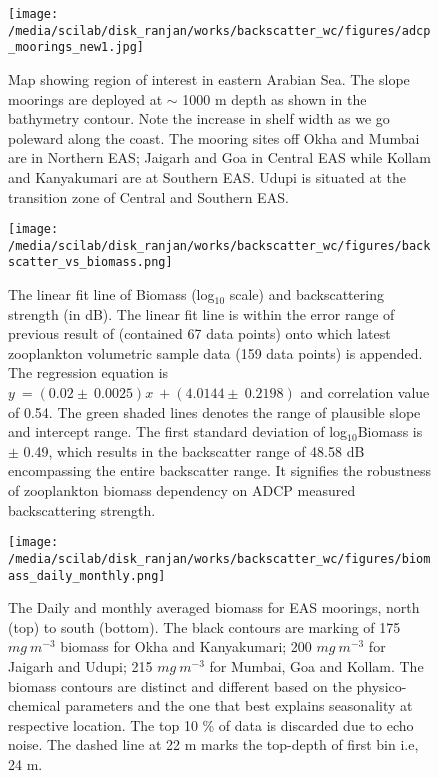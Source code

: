 \documentclass{article}
\begin{document}
\newpage
\begin{figure}[htbp]
	\centering
	\texttt{[image: /media/scilab/disk\_ranjan/works/backscatter\_wc/figures/adcp\_moorings\_new1.jpg]} 
	\captionsetup{justification=justified,font=footnotesize,skip=0.05\baselineskip,width=0.8\textwidth}
	\caption{Map showing region of interest in eastern Arabian Sea. The slope moorings are
		deployed at $\sim$ 1000 m depth as shown in the bathymetry contour. Note the increase in shelf width as we go poleward along the coast. The mooring sites off Okha and Mumbai are in Northern EAS; Jaigarh and Goa in Central EAS while Kollam and Kanyakumari are at Southern EAS. Udupi is situated at the transition zone of Central and Southern EAS.}
	\label{fig:map}
\end{figure}

\newpage
\begin{figure}[htbp]
	\centering
	\texttt{[image: /media/scilab/disk\_ranjan/works/backscatter\_wc/figures/backscatter\_vs\_biomass.png]} 
	\captionsetup{justification=justified,font=footnotesize,skip=0.05\baselineskip,width=0.8\textwidth}
	\caption{The linear fit line of Biomass (log$_10$ scale) and backscattering strength (in dB). The linear fit line is within the error range of previous result of \citep{aparna2022seasonal} (contained 67 data points) onto which latest zooplankton volumetric sample data (159 data points) is appended. The regression equation is $y\ = (0.02 \pm\ 0.0025) x\ + (4.0144 \pm \ 0.2198) $ and correlation value of 0.54. The green shaded lines denotes the range of plausible slope and intercept range. The first standard deviation of log$_{10}$Biomass is $\pm$ 0.49, which results in the backscatter range of 48.58 dB encompassing the entire backscatter range. It signifies the robustness of zooplankton biomass dependency on ADCP measured backscattering strength.}
	\label{fig:bstobm}
\end{figure}


\newpage


\begin{figure}[htbp]
	\centering
	\texttt{[image: /media/scilab/disk\_ranjan/works/backscatter\_wc/figures/biomass\_daily\_monthly.png]} 
	\captionsetup{justification=justified,font=footnotesize,skip=0.05\baselineskip,width=\textwidth}
	\caption{The Daily and monthly averaged biomass for EAS moorings, north (top) to south (bottom). The black contours are marking of 175 $mg\ m^{-3}$ biomass for Okha and Kanyakumari; 200 $mg\ m^{-3}$ for Jaigarh and Udupi; 215 $mg\ m^{-3}$  for Mumbai, Goa and Kollam. The biomass contours are distinct and different based on the physico-chemical parameters and the one that best explains seasonality at respective location.  The top 10 \% of data is discarded due to echo noise. The dashed line at 22 m marks the top-depth of first bin i.e, 24 m.}
	\label{fig:dailynmonthly}
\end{figure}
\end{document}
